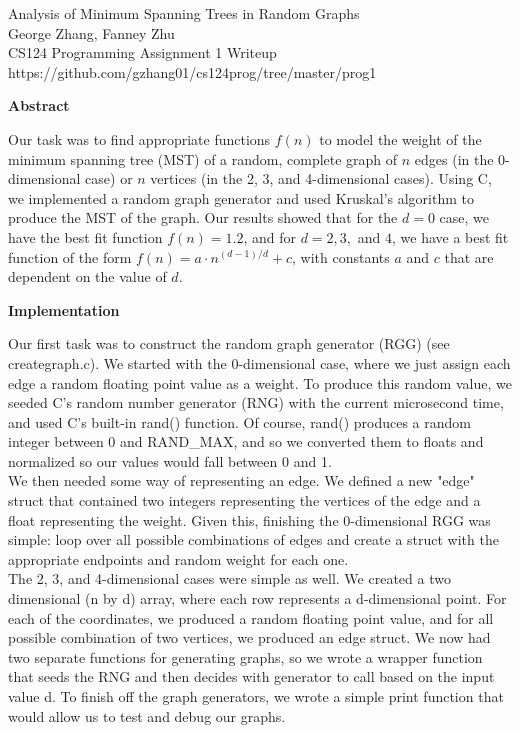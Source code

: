 \documentclass[12pt]{article}
\begin{document}
\begin{center}
Analysis of Minimum Spanning Trees in Random Graphs \\
George Zhang, Fanney Zhu \\
CS124 Programming Assignment 1 Writeup \\
https://github.com/gzhang01/cs124prog/tree/master/prog1 \\
\end{center}

\bigskip

\textbf{Abstract}

Our task was to find appropriate functions $f(n)$ to model the weight of the minimum spanning tree (MST) of a random, complete graph of $n$ edges (in the 0-dimensional case) or $n$ vertices (in the 2, 3, and 4-dimensional cases). Using C, we implemented a random graph generator and used Kruskal's algorithm to produce the MST of the graph. Our results showed that for the $d = 0$ case, we have the best fit function $f(n) = 1.2$, and for $d = 2, 3,$ and $4$, we have a best fit function of the form $f(n) = a\cdot n^{(d - 1)/d} + c$, with constants $a$ and $c$ that are dependent on the value of $d$.  \\

\bigskip

\textbf{Implementation}

Our first task was to construct the random graph generator (RGG) (see creategraph.c). We started with the 0-dimensional case, where we just assign each edge a random floating point value as a weight. To produce this random value, we seeded C's random number generator (RNG) with the current microsecond time, and used C's built-in rand() function. Of course, rand() produces a random integer between 0 and RAND\_MAX, and so we converted them to floats and normalized so our values would fall between 0 and 1. \\

We then needed some way of representing an edge. We defined a new "edge" struct that contained two integers representing the vertices of the edge and a float representing the weight. Given this, finishing the 0-dimensional RGG was simple: loop over all possible combinations of edges and create a struct with the appropriate endpoints and random weight for each one. \\

The 2, 3, and 4-dimensional cases were simple as well. We created a two dimensional (n by d) array, where each row represents a d-dimensional point. For each of the coordinates, we produced a random floating point value, and for all possible combination of two vertices, we produced an edge struct. We now had two separate functions for generating graphs, so we wrote a wrapper function that seeds the RNG and then decides with generator to call based on the input value d. To finish off the graph generators, we wrote a simple print function that would allow us to test and debug our graphs. \\
\end{document}
